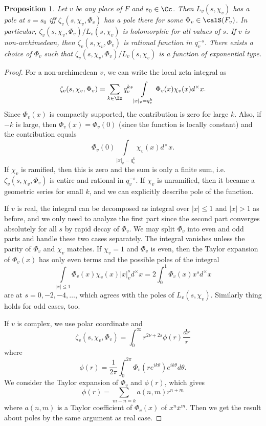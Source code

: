 \documentclass{article}
\newtheorem{proposition}{Proposition}[section]
\begin{document}
\begin{proposition}
Let $v$ be any place of $F$ and $s_{0}\in \Cc$. Then $L_{v}(s, \chi_{v})$ has a pole at $s = s_{0}$ iff $\zeta_{v}(s, \chi_{v}, \Phi_{v})$ has a pole there for some $\Phi_{v}\in \calS(F_{v})$. 
In particular, $\zeta_{v}(s, \chi_{v}, \Phi_{v}) / L_{v}(s, \chi_{v})$ is holomorphic for all values of $s$. 
If $v$ is non-archimedean, then $\zeta_{v}(s, \chi_{v},\Phi_{v})$ is rational function in $q_{v}^{-s}$. 
There exists a choice of $\Phi_{v}$ such that $\zeta_{v}(s, \chi_{v} ,\Phi_{v})/L_{v}(s, \chi_{v})$ is a function of exponential type. 
\end{proposition}
\begin{proof}
For a non-archimedean $v$, we can write the local zeta integral as
$$
\zeta_{v}(s, \chi_{v}, \Phi_{v}) = \sum_{k\in \Zz} q_{v}^{ks} \int\limits_{|x|_{v} = q_{v}^{k}} \Phi_{v}(x)\chi_{v}(x)d^{\times}x.
$$
Since $\Phi_{v}(x)$ is compactly supported, the contribution is zero for large $k$. Also, if $-k$ is large, 
then $\Phi_{v}(x) = \Phi_{v}(0)$ (since the function is locally constant) and the contribution equals
$$
\Phi_{v}(0)\int\limits_{|x|_{v} = q_{v}^{k}} \chi_{v}(x)d^{\times}x.
$$
If $\chi_{v}$ is ramified, then this is zero and the sum is only a finite sum, i.e. $\zeta_{v}(s, \chi_{v}, \Phi_{v})$ is entire and rational in $q_{v}^{-s}$. 
If $\chi_{v}$ is unramified, then it became a geometric series for small $k$, and we can explicitly describe pole of the function. 

If $v$ is real, the integral can be decomposed as integral over $|x|\leq 1$ and $|x|>1$ as before, and we only need to analyze the first part since the second part converges absolutely for all $s$ by rapid decay of $\Phi_{v}$. 
We may split $\Phi_{v}$ into even and odd parts and handle these two cases separately. 
The integral vanishes unless the parity of $\Phi_{v}$ and $\chi_{v}$ matches. 
If $\chi_{v} = 1$ and $\Phi_{v}$ is even, then the Taylor expansion of $\Phi_{v}(x)$ has only even terms and the possible poles of the integral 
$$
\int\limits_{|x|\leq 1} \Phi_{v}(x) \chi_{v}(x)|x|_{v}^{s} d^{\times}x = 2\int_{0}^{1} \Phi_{v}(x) x^{s} d^{\times} x
$$
are at $s = 0, -2, -4, \dots$, which agrees with the poles of $L_{v}(s, \chi_{v})$. Similarly thing holds for odd cases, too. 

If $v$ is complex,  we use polar coordinate and 
$$
\zeta_{v}(s,\chi_{v}, \Phi_{v}) = \int_{0}^{\infty} r^{2\nu + 2s} \phi(r) \frac{dr}{r}
$$
where $$\phi(r) = \frac{1}{2\pi} \int_{0}^{2\pi} \Phi_{v}(re^{ik\theta}) e^{ik\theta}d\theta.$$
We consider the Taylor expansion of $\Phi_{v}$ and $\phi(r)$, which gives
$$
\phi(r) = \sum_{m-n = k} a(n, m) r^{n+m}
$$
where $a(n, m)$ is a Taylor coefficient of $\Phi_{v}(x)$ of $x^{n}\overline{x}^{m}$. 
Then we get the result about poles by the same argument as real case. 


\end{proof}
\end{document}
